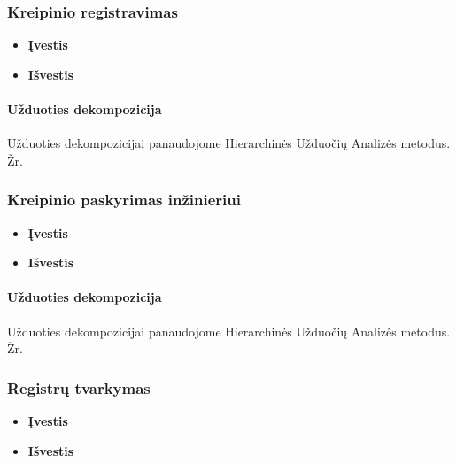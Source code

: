 	\subsubsection{Kreipinio registravimas}

		\begin{itemize}
			\item \textbf{Įvestis}
			\item \textbf{Išvestis} 
		\end{itemize}
		
		
	\paragraph{Užduoties dekompozicija}


	Užduoties dekompozicijai panaudojome Hierarchinės Užduočių Analizės metodus.
	Žr. 
	
	
	\subsubsection{Kreipinio paskyrimas inžinieriui}

		\begin{itemize}
			\item \textbf{Įvestis}
			\item \textbf{Išvestis} 
		\end{itemize}
		
		
	\paragraph{Užduoties dekompozicija}


	
	Užduoties dekompozicijai panaudojome Hierarchinės Užduočių Analizės metodus.
	Žr. 

	
	\subsubsection{Registrų tvarkymas}

		\begin{itemize}
			\item \textbf{Įvestis}
			\item \textbf{Išvestis} 
		\end{itemize}
		
